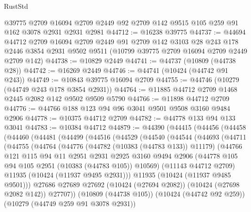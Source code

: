 \begin{lexlean}{RustStd}
\begin{coremodule}
    @39775
    @2709
    @16094
    @2709
    @2449
    @92
    @2709
    @142
    @9515
    @105
    @259
    @91
    @162
    @3078
    @2931
    @2931
    @2981
@44712 := @16238 @39775
@44737 := @44694
    @44712
    @2709
    @16094
    @2709
    @2449
    @91
    @2709
    @142
    @3103
    @28
    @243
    @178
    @2446
    @3854
    @2931
    @9502
    @9511
    (@10799 @39775 @2709 @16094 @2709 @2449 @2709 @142)
@44738 := @10829 @2449
@44741 := @44737 (@10809 (@44738 @28))
@44742 := @16269 @2449
@44746 := @44741 (@10424 (@44742 @91 @243))
@44749 := @10843 @39775 @16094 @2709
@44755 := @44746 (@10279 (@44749 @243 @178 @3854 @2931))
@44764 := @11885 @44712 @2709 @1468 @2445 @2082 @142 @9502 @9509 @5790
@44766 := @11898 @44712 @2709
@44776 := @44766 @188 @123 @94 @96 @3041 @9501 @9508 @3160 @9484 @2906
@44778 := @10375 @44712 @2709
@44782 := @44778 @133 @94 @133 @3041
@44783 := @10384 @44712
@44879 := @44390
    (@44415
      (@44456
        (@44458
          (@44460
            (@44481
              (@44499
                (@44516
                  (@44529
                    (@44540
                      (@44544
                        (@44693
                          (@44711
                            (@44755
                              (@44764
                                (@44776
                                  (@44782 (@10383 (@44783 @133)) @11179)
                                  (@44766
                                    @121
                                    @115
                                    @94
                                    @11
                                    @2951
                                    @2931
                                    @2925
                                    @3160
                                    @9494
                                    @2906
                                    (@44778 @105 @94 @105 @2951 (@10383 (@44783 @105)) @10569)
                                    (@11143 @44712 @2709)
                                    @11935
                                    (@10424 (@11937 @9495 @2931)))
                                  @11935
                                  (@10424 (@11937 @9485 @9501)))
                                @27686
                                @27689
                                @27692
                                (@10424 (@27694 @2082))
                                (@10424 (@27698 @2082 @142))
                                @27707))
                            (@10809 (@44738 @105))
                            (@10424 (@44742 @92 @259))
                            (@10279 (@44749 @259 @91 @3078 @2931))

\end{coremodule}
\end{lexlean}
